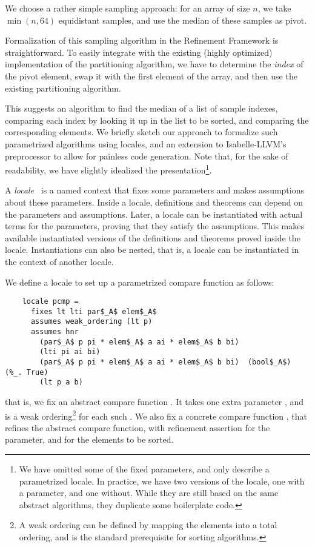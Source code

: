 \documentclass[runningheads]{llncs}
\begin{document}
  We choose a rather simple sampling approach: for an array of size $n$, we take $\min(n,64)$ equidistant samples,
  and use the median of these samples as pivot.

  Formalization of this sampling algorithm in the Refinement Framework is straightforward.
  To easily integrate with the existing (highly optimized) implementation of the partitioning algorithm,
  we have to determine the \emph{index} of the pivot element, swap it with the first element of the array,
  and then use the existing partitioning algorithm.

  This suggests an algorithm to find the median of a list of sample indexes, comparing each index by looking it up in
  the list to be sorted, and comparing the corresponding elements.
  We briefly sketch our approach to formalize such parametrized algorithms using locales, and
  an extension to Isabelle-LLVM's preprocessor to allow for painless code generation.
  Note that, for the sake of readability, we have slightly idealized the presentation\footnote{
    We have omitted some of the fixed parameters, and only describe a parametrized locale.
    In practice, we have two versions of the locale, one with a parameter, and one without. While they are still based on the same abstract algorithms, they duplicate some boilerplate code.
  }.

  A \emph{locale}~\cite{KWP99} is a named context that fixes some parameters and makes assumptions about these parameters.
  Inside a locale, definitions and theorems can depend on the parameters and assumptions.
  Later, a locale can be instantiated with actual terms for the parameters, proving that they satisfy the assumptions.
  This makes available instantiated versions of the definitions and theorems proved inside the locale.
  Instantiations can also be nested, that is, a locale can be instantiated in the context of another locale.

  We define a locale to set up a parametrized compare function as follows:
  \begin{lstlisting}
    locale pcmp =
      fixes lt lti par$_A$ elem$_A$
      assumes weak_ordering (lt p)
      assumes hnr
        (par$_A$ p pi * elem$_A$ a ai * elem$_A$ b bi)
        (lti pi ai bi)
        (par$_A$ p pi * elem$_A$ a ai * elem$_A$ b bi)  (bool$_A$)  (%_. True)
        (lt p a b)

  \end{lstlisting}
  that is, we fix an abstract compare function . It takes one extra parameter ,
  and is a weak ordering\footnote{
    A weak ordering can be defined by mapping the elements into a total ordering, and is the standard prerequisite for sorting algorithms.
  } for each such . We also fix a concrete compare function , that refines the abstract compare
  function, with refinement assertion  for the parameter, and  for the elements to be sorted.
\end{document}
